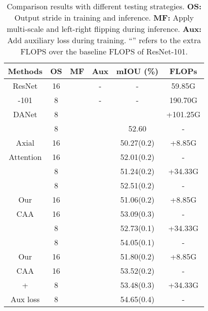 \documentclass[letterpaper]{article} \usepackage{aaai22}  \usepackage{times}  \usepackage{helvet}  \usepackage{courier}  \usepackage[hyphens]{url}  \usepackage{graphicx} \urlstyle{rm} \def\UrlFont{\rm}  \usepackage{natbib}  \usepackage{caption} \DeclareCaptionStyle{ruled}{labelfont=normalfont,labelsep=colon,strut=off} \frenchspacing  \setlength{\pdfpagewidth}{8.5in}  \setlength{\pdfpageheight}{11in}  \usepackage{algorithm}
\begin{document}
\begin{table}[t]
	\centering
	\small
	\begin{tabular}{c|c|c|c|c|c} 
		\toprule[1pt]
		Methods&OS& MF &Aux& mIOU (\%) & FLOPs\\ 
		\midrule[0.5pt]
		\midrule[0.5pt]
		ResNet& 16 &   & - & - & 59.85G \\
		-101& 8 &   & - & - & 190.70G  \\
		\midrule
		DANet& 8 &   & &  & +101.25G\\ 
		     & 8 & \checkmark  & \checkmark &52.60 & -   \\ 
		\midrule
		Axial     & 16    &               &       & 50.27(0.2)&  +8.85G\\ 
		Attention & 16    & \checkmark    &       & 52.01(0.2) & -\\ 
		          & 8     &               &       & 51.24(0.2) & +34.33G\\ 
		          & 8     & \checkmark    &       &52.51(0.2)  & -   \\ 
		\midrule
		Our       & 16    &               &     & 51.06(0.2)&  +8.85G\\
		CAA       & 16    & \checkmark    &   &53.09(0.3)      & -  \\
		          & 8     &               &       & 52.73(0.1) & +34.33G\\ 
		          & 8     & \checkmark    &       & 54.05(0.1) & -   \\ 
		\midrule
		Our   & 16    &               & \checkmark & 51.80(0.2)&  +8.85G\\
		 CAA         & 16 &\checkmark& \checkmark & 53.52(0.2)& - \\
		 + & 8 &          & \checkmark& 53.48(0.3)   & +34.33G\\
		 Aux loss  & 8 & \checkmark   &\checkmark &54.65(0.4)      & - \\
		\bottomrule[1pt]
	\end{tabular}
	\caption{Comparison results with different testing strategies. 
\textbf{OS:} Output stride in training and inference. \textbf{MF:} Apply multi-scale and left-right flipping during inference. \textbf{Aux:} Add auxiliary loss during training.
		``'' refers to the extra FLOPS over the baseline FLOPS of ResNet-101. }
	\label{table:teststrategies}
\end{table}
\end{document}
